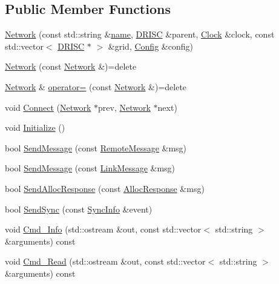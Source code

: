 \subsection*{Public Member Functions}
\begin{DoxyCompactItemize}
\item 
\hyperlink{class_simulator_1_1drisc_1_1_network_ad0c5ee05a56e03ef77e81f3545ffac12}{Network} (const std\+::string \&\hyperlink{mtconf_8c_a8f8f80d37794cde9472343e4487ba3eb}{name}, \hyperlink{class_simulator_1_1_d_r_i_s_c}{D\+R\+I\+S\+C} \&parent, \hyperlink{class_simulator_1_1_clock}{Clock} \&clock, const std\+::vector$<$ \hyperlink{class_simulator_1_1_d_r_i_s_c}{D\+R\+I\+S\+C} $\ast$ $>$ \&grid, \hyperlink{class_config}{Config} \&config)
\item 
\hyperlink{class_simulator_1_1drisc_1_1_network_a4b04f2c4add353c1b3eff781953069e9}{Network} (const \hyperlink{class_simulator_1_1drisc_1_1_network}{Network} \&)=delete
\item 
\hyperlink{class_simulator_1_1drisc_1_1_network}{Network} \& \hyperlink{class_simulator_1_1drisc_1_1_network_a5e80e6d66e6f5228bf9b230a6b807187}{operator=} (const \hyperlink{class_simulator_1_1drisc_1_1_network}{Network} \&)=delete
\item 
void \hyperlink{class_simulator_1_1drisc_1_1_network_a72420b5ab48a4bd4e60b4344977ae846}{Connect} (\hyperlink{class_simulator_1_1drisc_1_1_network}{Network} $\ast$prev, \hyperlink{class_simulator_1_1drisc_1_1_network}{Network} $\ast$next)
\item 
void \hyperlink{class_simulator_1_1drisc_1_1_network_a53539f8b2f58c0632d8388ad9380d881}{Initialize} ()
\item 
bool \hyperlink{class_simulator_1_1drisc_1_1_network_ad9cd402efe12cb1facb76f4b145eae36}{Send\+Message} (const \hyperlink{struct_simulator_1_1drisc_1_1_remote_message}{Remote\+Message} \&msg)
\item 
bool \hyperlink{class_simulator_1_1drisc_1_1_network_a9aba8dfe68d95f90fd5bdae8e520009e}{Send\+Message} (const \hyperlink{struct_simulator_1_1drisc_1_1_link_message}{Link\+Message} \&msg)
\item 
bool \hyperlink{class_simulator_1_1drisc_1_1_network_a80051a740ca0c61e9b3d1f97ad8f8da7}{Send\+Alloc\+Response} (const \hyperlink{struct_simulator_1_1drisc_1_1_alloc_response}{Alloc\+Response} \&msg)
\item 
bool \hyperlink{class_simulator_1_1drisc_1_1_network_adadd99fac4046f3e0dd54d2f12d227c8}{Send\+Sync} (const \hyperlink{struct_simulator_1_1drisc_1_1_network_1_1_sync_info}{Sync\+Info} \&event)
\item 
void \hyperlink{class_simulator_1_1drisc_1_1_network_ab09fd09ed632daf1cb2cd6461ed4b49d}{Cmd\+\_\+\+Info} (std\+::ostream \&out, const std\+::vector$<$ std\+::string $>$ \&arguments) const 
\item 
void \hyperlink{class_simulator_1_1drisc_1_1_network_a574560ff4003c74e013ab097fa6a8108}{Cmd\+\_\+\+Read} (std\+::ostream \&out, const std\+::vector$<$ std\+::string $>$ \&arguments) const 
\end{DoxyCompactItemize}
